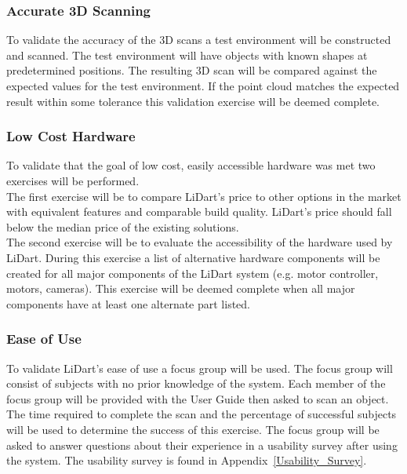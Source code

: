 \documentclass[12pt, titlepage]{article}
\begin{document}
\subsubsection{Accurate 3D Scanning}

To validate the accuracy of the 3D scans a test environment will be constructed and
scanned. The test environment will have objects with known shapes at predetermined positions.
The resulting 3D scan will be compared against the expected values for the test environment.
If the point cloud matches the expected result within some tolerance this validation exercise will
be deemed complete. 

\subsubsection{Low Cost Hardware}

To validate that the goal of low cost, easily accessible hardware was met two exercises will be performed. 
\ \\

\noindent The first exercise will be to compare LiDart's price to other options in the market with equivalent features
and comparable build quality. LiDart's price should fall below the median price of the existing solutions.
\ \\

\noindent The second exercise will be to evaluate the accessibility of the hardware used by LiDart. During
this exercise a list of alternative hardware components will be created for all major components of the LiDart
system (e.g. motor controller, motors, cameras). This exercise will be deemed complete when all major components
have at least one alternate part listed.

\subsubsection{Ease of Use}

To validate LiDart's ease of use a focus group will be used. The focus group will consist of
subjects with no prior knowledge of the system. Each member of the focus group will be provided
with the User Guide then asked to scan an object. The time required to complete the scan and the 
percentage of successful subjects will be used to determine the success of this exercise. The focus group will be asked to answer questions about their experience in a usability survey after using the system. The usability survey is found in Appendix~\ref{Usability_Survey}.
\ \\
\end{document}
